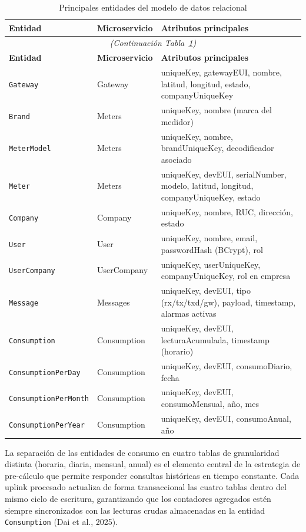 \documentclass[12pt,a4paper,oneside]{report}
\begin{document}
\begin{longtable}{lp{4.0cm}p{5.5cm}}
\caption{Principales entidades del modelo de datos relacional}\label{tab:entidades} \\
\toprule
\textbf{Entidad} & \textbf{Microservicio} & \textbf{Atributos principales} \\
\midrule
\endfirsthead
\multicolumn{3}{c}{\textit{(Continuación Tabla~\ref{tab:entidades})}} \\
\toprule
\textbf{Entidad} & \textbf{Microservicio} & \textbf{Atributos principales} \\
\midrule
\endhead
\bottomrule
\endlastfoot
\texttt{Gateway} & Gateway & uniqueKey, gatewayEUI, nombre, latitud, longitud, estado, companyUniqueKey \\
\texttt{Brand} & Meters & uniqueKey, nombre (marca del medidor) \\
\texttt{MeterModel} & Meters & uniqueKey, nombre, brandUniqueKey, decodificador asociado \\
\texttt{Meter} & Meters & uniqueKey, devEUI, serialNumber, modelo, latitud, longitud, companyUniqueKey, estado \\
\texttt{Company} & Company & uniqueKey, nombre, RUC, dirección, estado \\
\texttt{User} & User & uniqueKey, nombre, email, passwordHash (BCrypt), rol \\
\texttt{UserCompany} & UserCompany & uniqueKey, userUniqueKey, companyUniqueKey, rol en empresa \\
\texttt{Message} & Messages & uniqueKey, devEUI, tipo (rx/tx/txd/gw), payload, timestamp, alarmas activas \\
\texttt{Consumption} & Consumption & uniqueKey, devEUI, lecturaAcumulada, timestamp (horario) \\
\texttt{ConsumptionPerDay} & Consumption & uniqueKey, devEUI, consumoDiario, fecha \\
\texttt{ConsumptionPerMonth} & Consumption & uniqueKey, devEUI, consumoMensual, año, mes \\
\texttt{ConsumptionPerYear} & Consumption & uniqueKey, devEUI, consumoAnual, año \\
\bottomrule
\end{longtable}

La separación de las entidades de consumo en cuatro tablas de granularidad distinta (horaria, diaria, mensual, anual) es el elemento central de la estrategia de pre-cálculo que permite responder consultas históricas en tiempo constante. Cada uplink procesado actualiza de forma transaccional las cuatro tablas dentro del mismo ciclo de escritura, garantizando que los contadores agregados estén siempre sincronizados con las lecturas crudas almacenadas en la entidad \texttt{Consumption} (Dai et al., 2025).
\end{document}

